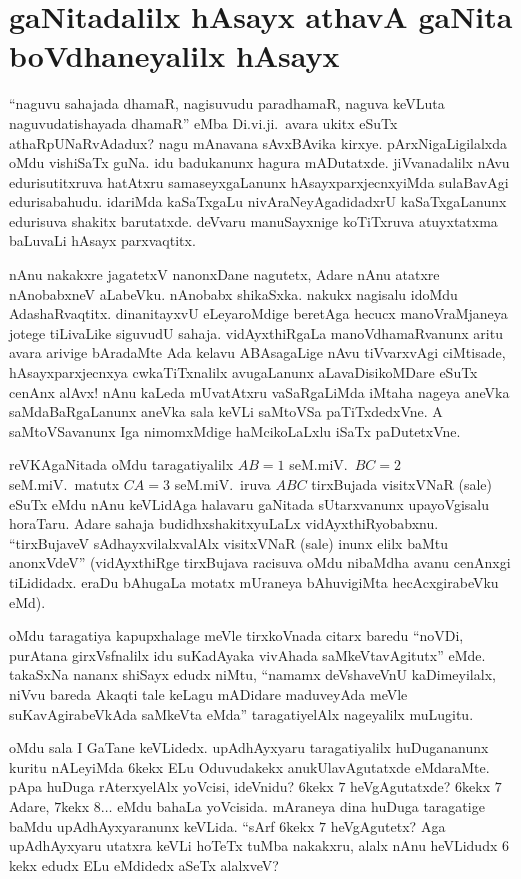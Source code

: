 \chapter{gaNitadalilx hAsayx athavA gaNita boVdhaneyalilx hAsayx}\label{chap14}

``naguvu sahajada dhamaR, nagisuvudu paradhamaR, naguva keVLuta naguvudatishayada dhamaR'' eMba Di.vi.ji.\ avara ukitx eSuTx athaRpUNaRvAdadux? nagu mAnavana sAvxBAvika kirxye. pArxNigaLigilalxda oMdu vishiSaTx guNa. idu badukanunx hagura mADutatxde. jiVvanadalilx nAvu edurisutitxruva hatAtxru samaseyxgaLanunx hAsayxparxjecnxyiMda sulaBavAgi edurisabahudu. idariMda kaSaTxgaLu nivAraNeyAgadidadxrU kaSaTxgaLanunx edurisuva shakitx barutatxde. deVvaru manuSayxnige koTiTxruva atuyxtatxma baLuvaLi hAsayx parxvaqtitx.

nAnu nakakxre jagatetxV nanonxDane nagutetx, Adare nAnu atatxre nAnobabxneV aLabeVku. nAnobabx shikaSxka. nakukx nagisalu idoMdu AdashaRvaqtitx. dinanitayxvU eLeyaroMdige beretAga hecucx manoVraMjaneya jotege tiLivaLike siguvudU sahaja. vidAyxthiRgaLa manoVdhamaRvanunx aritu avara arivige bAradaMte Ada kelavu ABAsagaLige nAvu tiVvarxvAgi ciMtisade, hAsayxparxjecnxya cwkaTiTxnalilx avugaLanunx aLavaDisikoMDare eSuTx cenAnx alAvx! nAnu kaLeda mUvatAtxru vaSaRgaLiMda iMtaha nageya aneVka saMdaBaRgaLanunx aneVka sala keVLi saMtoVSa paTiTxdedxVne. A saMtoVSavanunx Iga nimomxMdige haMcikoLaLxlu iSaTx paDutetxVne.

reVKAgaNitada oMdu taragatiyalilx $AB=1$ seM.miV.\ $BC=2$ seM.miV.\ matutx $CA=3$ seM.miV.\ iruva $ABC$ tirxBujada visitxVNaR (sale) eSuTx eMdu nAnu keVLidAga halavaru gaNitada sUtarxvanunx upayoVgisalu horaTaru. Adare sahaja budidhxshakitxyuLaLx vidAyxthiRyobabxnu. ``tirxBujaveV sAdhayxvilalxvalAlx visitxVNaR (sale) inunx elilx baMtu anonxVdeV'' (vidAyxthiRge tirxBujava racisuva oMdu nibaMdha avanu cenAnxgi tiLididadx. eraDu bAhugaLa motatx mUraneya bAhuvigiMta hecAcxgirabeVku eMd).

oMdu taragatiya kapupxhalage meVle tirxkoVnada citarx baredu ``noVDi, purAtana girxVsfnalilx idu suKadAyaka vivAhada saMkeVtavAgitutx'' eMde. takaSxNa nananx shiSayx edudx niMtu, ``namamx deVshaveVnU kaDimeyilalx, niVvu bareda Akaqti tale keLagu mADidare maduveyAda meVle suKavAgirabeVkAda saMkeVta eMda'' taragatiyelAlx nageyalilx muLugitu.

oMdu sala I GaTane keVLidedx. upAdhAyxyaru taragatiyalilx huDugananunx kuritu nALeyiMda $6$kekx ELu Oduvudakekx anukUlavAgutatxde eMdaraMte. pApa huDuga rAterxyelAlx yoVcisi, ideVnidu? $6$kekx $7$ heVgAgutatxde? $6$kekx $7$ Adare, $7$kekx $8\ldots$ eMdu bahaLa yoVcisida. mAraneya dina huDuga taragatige baMdu upAdhAyxyaranunx keVLida. ``sArf $6$kekx $7$ heVgAgutetx? Aga upAdhAyxyaru utatxra keVLi hoTeTx tuMba nakakxru, alalx nAnu heVLidudx $6$kekx edudx ELu eMdidedx aSeTx alalxveV?

